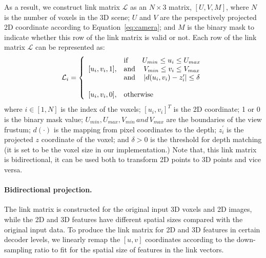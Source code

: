 \documentclass[final]{cvpr}
\begin{document}
As a result, we construct link matrix $\mathcal{L}$ as an $N \times 3$ matrix, $[U, V, M]$, where $N$ is the number of voxels in the 3D scene; $U$ and $V$ are the perspectively projected 2D coordinate according to Equation~\ref{eq:camera}; and $M$ is the binary mask to indicate whether this row of the link matrix is valid or not.
Each row of the link matrix $\mathcal{L}$ can be represented as:
\begin{equation}
\mathcal{L}_i = \left\{
	\begin{array}{ll}
		& \text{if}      \qquad    U_{min}\leq u_i \leq U_{max}             \\
		{[u_i,v_i,1]}, & \text{and}  \quad\,      V_{min}\leq v_i \leq V_{max}             \\
		& \text{and}      \quad \,  |d(u_i,v_i) - z_i^{\prime}| \leq \delta \\
		&                                                                   \\
		{[u_i,v_i,0]}, & \text{otherwise}
	\end{array}
	\right.
		\vspace{-1mm}
\end{equation}
where $i \in [1,N]$ is the index of the voxels; $[u_i,v_i]^T$ is the 2D coordinate; 1 or 0 is the binary mask value; $U_{min},U_{max},V_{min}\,and\,V_{max}$ are the boundaries of the view frustum; $d(\cdot)$ is the mapping from pixel coordinates to the depth; $z_i^{\prime}$ is the projected $z$ coordinate of the voxel; and $\delta>0$ is the threshold for depth matching (it is set to be the voxel size in our implementation.) 
Note that, this link matrix is bidirectional, it can be used both to transform 2D points to 3D points and vice versa.



\vspace{-5mm}
\paragraph{Bidirectional projection.}
The link matrix is constructed for the original input 3D voxels and 2D images, while the 2D and 3D features have different spatial sizes compared with the original input data.
To produce the link matrix for 2D and 3D features in certain decoder levels, we linearly remap the $[u,v]$ coordinates according to the down-sampling ratio to fit for the spatial size of features in the link vectors.
\end{document}
